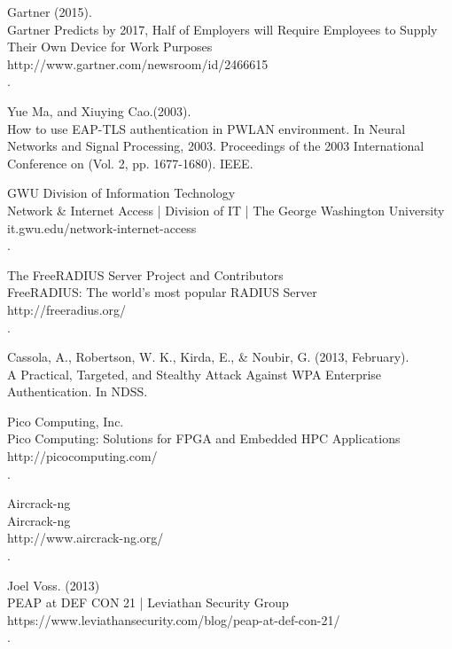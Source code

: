\documentclass[twoside]{article}
\begin{document}
\pagebreak
\begin{thebibliography}{99} 

Gartner (2015).\\
\newblock Gartner Predicts by 2017, Half of Employers will Require Employees to Supply Their Own Device for Work Purposes\\
\newblock http://www.gartner.com/newsroom/id/2466615\\
.

Yue Ma, and Xiuying Cao.(2003).\\
\newblock How to use EAP-TLS authentication in PWLAN environment. In Neural Networks and Signal Processing, 2003. Proceedings of the 2003 International Conference on (Vol. 2, pp. 1677-1680). IEEE.

GWU Division of Information Technology \\
\newblock Network \& Internet Access | Division of IT | The George Washington University\\
\newblock it.gwu.edu/network-internet-access\\
.

The FreeRADIUS Server Project and Contributors \\
\newblock FreeRADIUS: The world's most popular RADIUS Server\\
\newblock http://freeradius.org/\\
.

Cassola, A., Robertson, W. K., Kirda, E., \& Noubir, G. (2013, February).\\
\newblock  A Practical, Targeted, and Stealthy Attack Against WPA Enterprise Authentication. In NDSS.

Pico Computing, Inc.\\
\newblock Pico Computing: Solutions for FPGA and Embedded HPC Applications\\
\newblock http://picocomputing.com/\\
.

Aircrack-ng\\
\newblock Aircrack-ng\\
\newblock http://www.aircrack-ng.org/\\
.

Joel Voss. (2013)\\
\newblock PEAP at DEF CON 21 | Leviathan Security Group\\
\newblock https://www.leviathansecurity.com/blog/peap-at-def-con-21/\\
.

\end{thebibliography}
\end{document}
